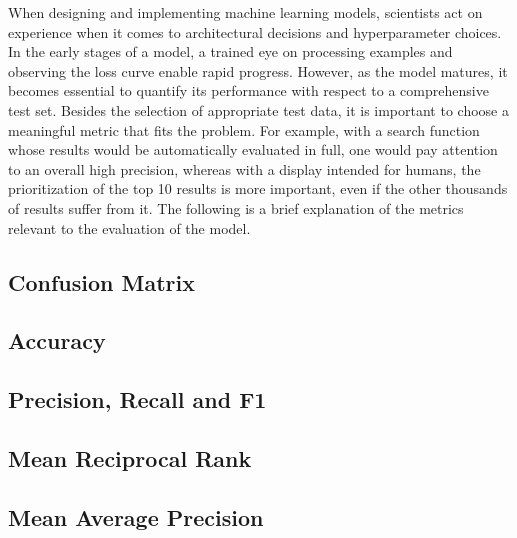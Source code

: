 When designing and implementing machine learning models, scientists act on experience when it comes to architectural decisions and hyperparameter choices. In the early stages of a model, a trained eye on processing examples and observing the loss curve enable rapid progress. However, as the model matures, it becomes essential to quantify its performance with respect to a comprehensive test set. Besides the selection of appropriate test data, it is important to choose a meaningful metric that fits the problem. For example, with a search function whose results would be automatically evaluated in full, one would pay attention to an overall high precision, whereas with a display intended for humans, the prioritization of the top 10 results is more important, even if the other thousands of results suffer from it. The following is a brief explanation of the metrics relevant to the evaluation of the model.

\subsection{Confusion Matrix}
\label{subsec:3_basics/4_metrics/1_confusion_matrix}


\subsection{Accuracy}
\label{subsec:3_basics/4_metrics/2_accuracy}


\subsection{Precision, Recall and F1}
\label{subsec:3_basics/4_metrics/3_prf}


\subsection{Mean Reciprocal Rank}
\label{subsec:3_basics/4_metrics/4_mrr}


\subsection{Mean Average Precision}
\label{subsec:3_basics/4_metrics/5_map}

